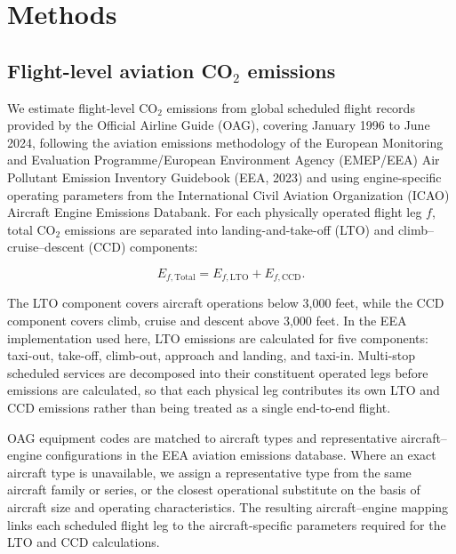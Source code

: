 \documentclass[12pt]{article}
\begin{document}
\section*{Methods}
\subsection*{Flight-level aviation CO$_2$ emissions}

We estimate flight-level CO$_2$ emissions from global scheduled flight records provided by the Official Airline Guide (OAG), covering January 1996 to June 2024, following the aviation emissions methodology of the European Monitoring and Evaluation Programme/European Environment Agency (EMEP/EEA) Air Pollutant Emission Inventory Guidebook (EEA, 2023) and using engine-specific operating parameters from the International Civil Aviation Organization (ICAO) Aircraft Engine Emissions Databank. For each physically operated flight leg $f$, total CO$_2$ emissions are separated into landing-and-take-off (LTO) and climb--cruise--descent (CCD) components:

\begin{equation}
E_{f,\mathrm{Total}}
=
E_{f,\mathrm{LTO}}
+
E_{f,\mathrm{CCD}} .
\label{eq:nature_1}
\end{equation}

The LTO component covers aircraft operations below 3,000 feet, while the CCD component covers climb, cruise and descent above 3,000 feet. In the EEA implementation used here, LTO emissions are calculated for five components: taxi-out, take-off, climb-out, approach and landing, and taxi-in. Multi-stop scheduled services are decomposed into their constituent operated legs before emissions are calculated, so that each physical leg contributes its own LTO and CCD emissions rather than being treated as a single end-to-end flight.

OAG equipment codes are matched to aircraft types and representative aircraft--engine configurations in the EEA aviation emissions database. Where an exact aircraft type is unavailable, we assign a representative type from the same aircraft family or series, or the closest operational substitute on the basis of aircraft size and operating characteristics. The resulting aircraft--engine mapping links each scheduled flight leg to the aircraft-specific parameters required for the LTO and CCD calculations.
\end{document}
